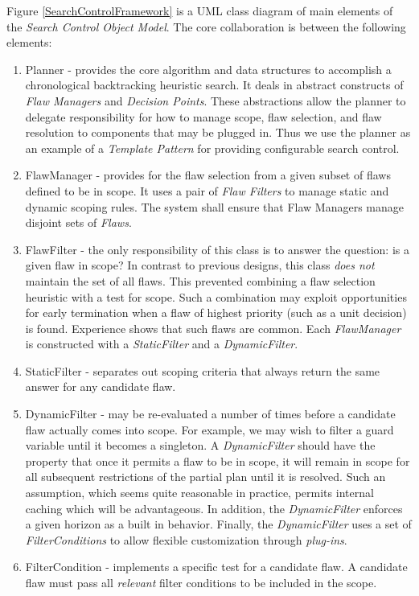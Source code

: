 \documentclass[10pt, letterpaper, oneside]{article}
\begin{document}
Figure \ref{SearchControlFramework} is a UML class diagram of main elements of the {\em Search Control Object Model}. The core collaboration is between the following elements:
\begin{enumerate}
\item Planner - provides the core algorithm and data structures to accomplish a chronological backtracking heuristic search. It deals in abstract constructs of {\em Flaw Managers} and {\em Decision Points}. These abstractions allow the planner to delegate responsibility for how to manage scope, flaw selection, and flaw resolution to components that may be plugged in. Thus we use the planner as an example of a {\em Template Pattern} for providing configurable search control.
\item FlawManager - provides for the flaw selection from a given subset of flaws defined to be in scope. It uses a pair of {\em Flaw Filters} to manage static and dynamic scoping rules. The system shall ensure that Flaw Managers manage disjoint sets of {\em Flaws}.
\item FlawFilter - the only responsibility of this class is to answer the question: is a given flaw in scope? In contrast to previous designs, this class {\em does not} maintain the set of all flaws. This prevented combining a flaw selection heuristic with a test for scope. Such a combination may exploit opportunities for early termination when a flaw of highest priority (such as a unit decision) is found. Experience shows that such flaws are common. Each {\em FlawManager} is constructed with a {\em StaticFilter} and a {\em DynamicFilter}. 
\item StaticFilter - separates out scoping criteria that always return the same answer for any candidate flaw. 
\item DynamicFilter - may be re-evaluated a number of times before a candidate flaw actually comes into scope. For example, we may wish to filter a guard variable until it becomes a singleton. A {\em DynamicFilter} should have the property that once it permits a flaw to be in scope, it will remain in scope for all subsequent restrictions of the partial plan until it is resolved. Such an assumption, which seems quite reasonable in practice, permits internal caching which will be advantageous. In addition, the {\em DynamicFilter} enforces a given horizon as a built in behavior. Finally, the {\em DynamicFilter} uses a set of {\em FilterConditions} to allow flexible customization through {\em plug-ins}.
\item FilterCondition - implements a specific test for a candidate flaw. A candidate flaw must pass all {\em relevant} filter conditions to be included in the scope.

\end{enumerate}
\end{document}
